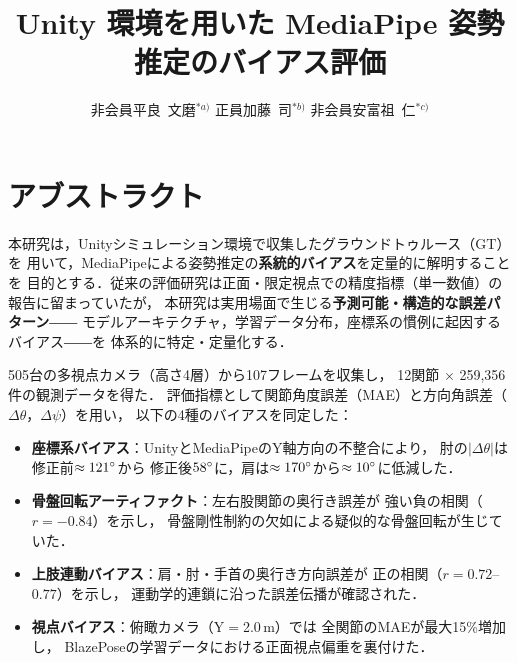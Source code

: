 \documentclass[twocolumn]{article}
\title{Unity 環境を用いた MediaPipe 姿勢推定のバイアス評価}
\author{%
  非会員\quad 平良\ 文磨$^{*a)}$ \qquad
  正員\quad   加藤\ 司$^{*b)}$ \qquad
  非会員\quad 安富祖\ 仁$^{*c)}$\footnotemark[1]
}
\date{}
\begin{document}
\maketitle

\begingroup
\renewcommand{\thefootnote}{}
\endgroup

\section*{アブストラクト}

本研究は，Unityシミュレーション環境で収集したグラウンドトゥルース（GT）を
用いて，MediaPipeによる姿勢推定の\textbf{系統的バイアス}を定量的に解明することを
目的とする．従来の評価研究は正面・限定視点での精度指標（単一数値）の報告に留まっていたが，
本研究は実用場面で生じる\textbf{予測可能・構造的な誤差パターン}――
モデルアーキテクチャ，学習データ分布，座標系の慣例に起因するバイアス――を
体系的に特定・定量化する．

505台の多視点カメラ（高さ4層）から107フレームを収集し，
12関節 $\times$ 259,356件の観測データを得た．
評価指標として関節角度誤差（MAE）と方向角誤差（$\Delta\theta$，$\Delta\psi$）を用い，
以下の4種のバイアスを同定した：

\begin{itemize}\itemsep0pt
  \item \textbf{座標系バイアス}：UnityとMediaPipeのY軸方向の不整合により，
        肘の$|\Delta\theta|$は修正前$\approx121\degree{}$から
        修正後$58\degree{}$に，肩は$\approx170\degree{}$から$\approx10\degree{}$に低減した．
  \item \textbf{骨盤回転アーティファクト}：左右股関節の奥行き誤差が
        強い負の相関（$r=-0.84$）を示し，
        骨盤剛性制約の欠如による疑似的な骨盤回転が生じていた．
  \item \textbf{上肢連動バイアス}：肩・肘・手首の奥行き方向誤差が
        正の相関（$r=0.72$--$0.77$）を示し，
        運動学的連鎖に沿った誤差伝播が確認された．
  \item \textbf{視点バイアス}：俯瞰カメラ（Y$=$2.0\,m）では
        全関節のMAEが最大15\%増加し，
        BlazePoseの学習データにおける正面視点偏重を裏付けた．
\end{itemize}

\vspace{-0.8em}
\end{document}
